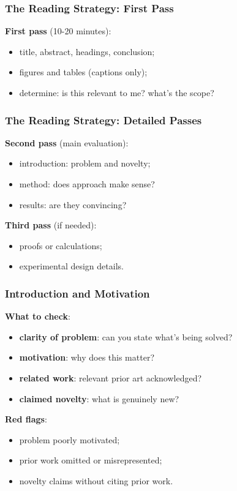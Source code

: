 \documentclass[]{beamer}
\begin{document}
\begin{frame}[fragile]
\frametitle{The Reading Strategy: First Pass}
\textbf{First pass} (10-20 minutes):
\begin{itemize}
  \item title, abstract, headings, conclusion;
  \item figures and tables (captions only);
  \item determine: is this relevant to me? what's the scope?
\end{itemize}

\end{frame}

\begin{frame}[fragile]
\frametitle{The Reading Strategy: Detailed Passes}
\textbf{Second pass} (main evaluation):
\begin{itemize}
  \item introduction: problem and novelty;
  \item method: does approach make sense?
  \item results: are they convincing?
\end{itemize}

\textbf{Third pass} (if needed):
\begin{itemize}
  \item proofs or calculations;
  \item experimental design details.
\end{itemize}

\end{frame}

\begin{frame}[fragile]
\frametitle{Introduction and Motivation}
\textbf{What to check}:
\begin{itemize}
  \item \textbf{clarity of problem}: can you state what's being solved?
  \item \textbf{motivation}: why does this matter?
  \item \textbf{related work}: relevant prior art acknowledged?
  \item \textbf{claimed novelty}: what is genuinely new?
\end{itemize}

\textbf{Red flags}:
\begin{itemize}
  \item problem poorly motivated;
  \item prior work omitted or misrepresented;
  \item novelty claims without citing prior work.
\end{itemize}

\end{frame}
\end{document}
